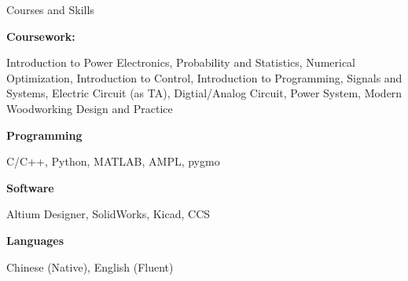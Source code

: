 \documentclass[]{ZhongtaoGuan-resume}
\begin{document}
\begin{section}{Courses and Skills}

\begin{subsectionnobullet}{\textbf{Coursework:}}{}{}{}
 \item {Introduction to Power Electronics, Probability and Statistics, Numerical Optimization, Introduction to Control, Introduction to Programming,
Signals and Systems, Electric Circuit (as TA), Digtial/Analog Circuit, Power System, Modern Woodworking Design and Practice}
\end{subsectionnobullet}
\begin{subsectionnobullet}{\textbf{Programming}}{}{}{}
    \item {C/C++, Python, MATLAB, AMPL, pygmo}
\end{subsectionnobullet}
\begin{subsectionnobullet}{\textbf{Software}}{}{}{}
    \item {Altium Designer, SolidWorks, Kicad, CCS}
\end{subsectionnobullet}
\begin{subsectionnobullet}{\textbf{Languages}}{}{}{}
    \item {Chinese (Native), English (Fluent)}
\end{subsectionnobullet}
\end{section}
\end{document}
